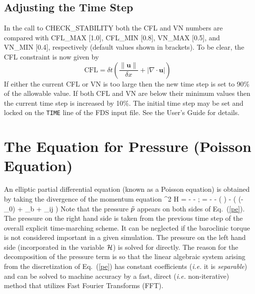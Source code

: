 \subsection{Adjusting the Time Step} In the call to {\ct CHECK\_STABILITY} both the CFL and VN numbers are compared with {\ct CFL\_MAX [1.0]}, {\ct CFL\_MIN [0.8]}, {\ct VN\_MAX [0.5]}, and {\ct VN\_MIN [0.4]}, respectively (default values shown in brackets).  To be clear, the CFL constraint is now given by
\begin{equation}
\mbox{CFL} = \delta t \left( \frac{\|\mathbf{u}\|}{\delta x} + |\nabla\cdot\mathbf{u}| \right)
\end{equation}
If either the current CFL or VN is too large then the new time step is set to 90\% of the allowable value.  If both CFL and VN are below their minimum values then the current time step is increased by 10\%.  The initial time step may be set and locked on the {\tt TIME} line of the FDS input file.  See the User's Guide for details.


\clearpage
\section{The Equation for Pressure (Poisson Equation)}

An elliptic partial differential equation (known as a Poisson equation) is obtained by
taking the divergence of the momentum equation
\be \nabla^2 {\cal H} =
     - - \nabla\!\cdot \bF
    \quad ; \quad \bF = - \bu\times\bo - \tp \nabla \left(  \right) - 
    \Big( (\rho-\rho_0) \bg + \bof_b + \nabla\!\cdot \btau_{ij} \Big)
   \label{pe}\ee
Note that the pressure $\tilde{p}$ appears on both sides of Eq.~(\ref{pe}). The
pressure on the right hand side is taken from the previous time step of the
overall explicit time-marching scheme. It can be neglected if the baroclinic torque is
not considered important in a given simulation. The pressure on the left hand side (incorporated
in the variable $\cal H$) is solved for directly.
The reason for the decomposition of the pressure term is so that the linear algebraic system
arising from the discretization of Eq.~(\ref{pe})
has constant coefficients ({\em i.e.} it is {\em separable}) and can be solved to machine accuracy
by a fast, direct ({\em i.e.} non-iterative) method that utilizes
Fast Fourier Transforms (FFT).

